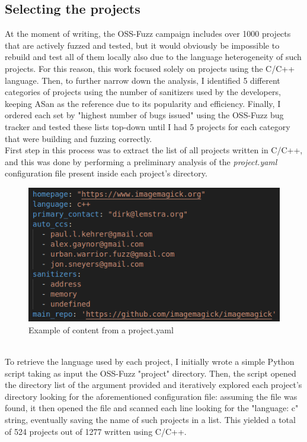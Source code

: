 \subsection{Selecting the projects} \label{selection}
At the moment of writing, the OSS-Fuzz campaign includes over 1000 projects that are actively fuzzed and tested, but it would obviously be impossible to rebuild and test all of them locally also due to the language heterogeneity of such projects.
\newline
For this reason, this work focused solely on projects using the C/C++ language.
\newline
Then, to further narrow down the analysis, I identified 5 different categories of projects using the number of sanitizers used by the developers, keeping ASan as the reference due to its popularity and efficiency.
\newline
Finally, I ordered each set by "highest number of bugs issued" using the OSS-Fuzz bug tracker and tested these lists top-down until I had 5 projects for each category that were building and fuzzing correctly.
\ \\ \newline \newline
First step in this process was to extract the list of all projects written in C/C++, and this was done by performing a preliminary analysis of the \textit{project.yaml} configuration file present inside each project's directory.
\newline
\begin{figure}[h]
\centering
\includegraphics[scale=0.65]{foto/project_yaml.png}
\caption{Example of content from a project.yaml}
\label{fig:project_yaml}
\end{figure}
\ \\
To retrieve the language used by each project, I initially wrote a simple Python script taking as input the OSS-Fuzz "project" directory.
\newline
Then, the script opened the directory list of the argument provided and iteratively explored each project's directory looking for the aforementioned configuration file: assuming the file was found, it then opened the file and scanned each line looking for the "language: c" string, eventually saving the name of such projects in a list.
\newline \newline
This yielded a total of 524 projects out of 1277 written using C/C++.


